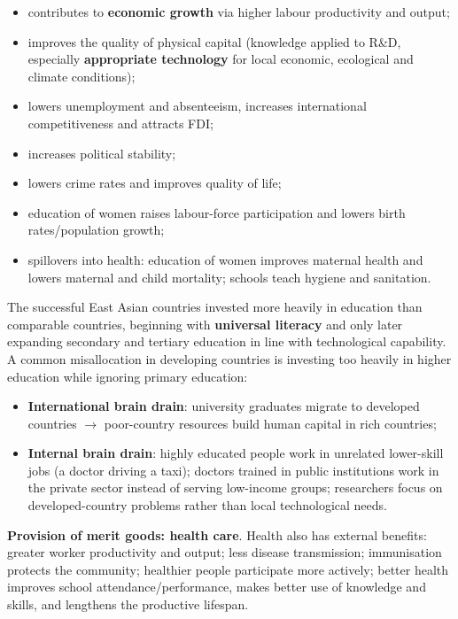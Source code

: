 \begin{itemize}
  \item contributes to \textbf{economic growth} via higher labour productivity and output;
  \item improves the quality of physical capital (knowledge applied to R\&D, especially \textbf{appropriate technology} for local economic, ecological and climate conditions);
  \item lowers unemployment and absenteeism, increases international competitiveness and attracts FDI;
  \item increases political stability;
  \item lowers crime rates and improves quality of life;
  \item education of women raises labour-force participation and lowers birth rates/population growth;
  \item spillovers into health: education of women improves maternal health and lowers maternal and child mortality; schools teach hygiene and sanitation.
\end{itemize}
The successful East Asian countries invested more heavily in education than comparable countries, beginning with \textbf{universal literacy} and only later expanding secondary and tertiary education in line with technological capability. A common misallocation in developing countries is investing too heavily in higher education while ignoring primary education:
\begin{itemize}
  \item \textbf{International brain drain}: university graduates migrate to developed countries $\to$ poor-country resources build human capital in rich countries;
  \item \textbf{Internal brain drain}: highly educated people work in unrelated lower-skill jobs (a doctor driving a taxi); doctors trained in public institutions work in the private sector instead of serving low-income groups; researchers focus on developed-country problems rather than local technological needs.
\end{itemize}
\textbf{Provision of merit goods: health care}. Health also has external benefits: greater worker productivity and output; less disease transmission; immunisation protects the community; healthier people participate more actively; better health improves school attendance/performance, makes better use of knowledge and skills, and lengthens the productive lifespan.
